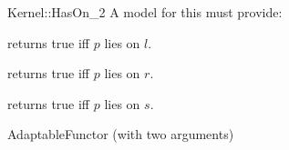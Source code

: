 \begin{ccRefFunctionObjectConcept}{Kernel::HasOn_2}
A model for this must provide:


{returns true iff $p$ lies on $l$.}

{returns true iff $p$ lies on $r$.}

{returns true iff $p$ lies on $s$.}

\ccRefines
AdaptableFunctor (with two arguments)

\ccSeeAlso
{} \\
 \\
 \\


\end{ccRefFunctionObjectConcept}
